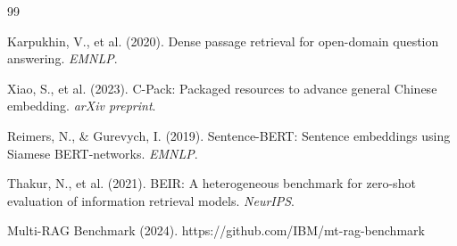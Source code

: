 \documentclass[11pt]{article}
\begin{document}
\begin{thebibliography}{99}

Karpukhin, V., et al. (2020). Dense passage retrieval for open-domain question answering. \textit{EMNLP}.

Xiao, S., et al. (2023). C-Pack: Packaged resources to advance general Chinese embedding. \textit{arXiv preprint}.

Reimers, N., \& Gurevych, I. (2019). Sentence-BERT: Sentence embeddings using Siamese BERT-networks. \textit{EMNLP}.

Thakur, N., et al. (2021). BEIR: A heterogeneous benchmark for zero-shot evaluation of information retrieval models. \textit{NeurIPS}.

Multi-RAG Benchmark (2024). https://github.com/IBM/mt-rag-benchmark

\end{thebibliography}
\end{document}
